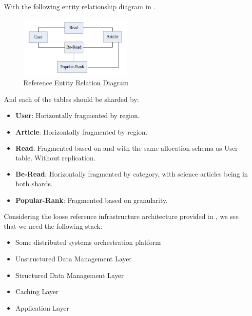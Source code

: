 \documentclass{report}
\begin{document}
    With the following entity relationship diagram in .

    \begin{figure}[h]
        \centering
        \includegraphics[width=0.5\textwidth]{images/reference-entity-relation-diagram}
        \caption{Reference Entity Relation Diagram}
        \label{fig:reference-entity-relation-diagram}
    \end{figure}

    And each of the tables should be sharded by:

    \begin{itemize}
        \item \textbf{User}: Horizontally fragmented by region.
        \item \textbf{Article}: Horizontally fragmented by region.
        \item \textbf{Read}: Fragmented based on and with the same allocation schema as User table. Without replication.
        \item \textbf{Be-Read}: Horizontally fragmented by category, with science articles being in both shards.
        \item \textbf{Popular-Rank}: Fragmented based on granularity.
    \end{itemize}

    Considering the loose reference infrastructure architecture provided in , we see that we need the following stack:

    \begin{itemize}
        \item Some distributed systems orchestration platform
        \item Unstructured Data Management Layer
        \item Structured Data Management Layer
        \item Caching Layer
        \item Application Layer
    \end{itemize}
\end{document}

